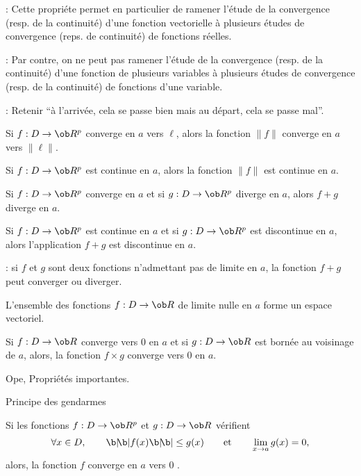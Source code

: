 \Remarque : Cette propriéte permet en particulier de ramener l'étude de la convergence (resp. de la continuité) d'une fonction vectorielle à plusieurs études de convergence (reps. de continuité) de fonctions réelles. 
\bigskip

\Remarque : Par contre, on ne peut pas ramener l'étude de la convergence (resp. de la continuité) d'une fonction de plusieurs variables à plusieurs études de convergence (resp. de la continuité) de fonctions d'une variable. 
\bigskip

\Remarque : Retenir ``à l'arrivée, cela se passe bien mais au départ, cela se passe mal''. 


Si $f:D\to\ob R^p$ converge en $a$ vers $\ell$, alors la fonction $\|f\|$ converge en $a$ vers $\|\ell\|$. 

\Invertedtrue
{} 
Si $f:D\to\ob R^p$ est continue en $a$, alors la fonction $\|f\|$ est continue en $a$. \pn


\Propriete [$D\subset\ob R^n$, $a\in\ob R^n$]
Si $f:D\to\ob R^p$ converge en $a$ et si $g:D\to\ob R^p$ diverge en $a$, alors $f+g$ diverge en $a$. 

\Invertedtrue
\Propriete [$D\subset\ob R^n$]
Si $f:D\to\ob R^p$ est continue en $a$ et si $g:D\to\ob R^p$ est discontinue en $a$, alors l'application $f+g$ est discontinue en $a$. \pn

\Remarque : si $f$ et $g$ sont deux fonctions n'admettant pas de limite en $a$, la fonction $f+g$ peut converger ou diverger. 
\bigskip


\Propriete [$D$ voisinage de $a\in\ob R^n$] 
L'ensemble des fonctions $f:D\to\ob R$ de limite nulle en $a$ forme un espace vectoriel. 

\Propriete [$D\subset\ob R^n$] 
Si $f:D\to\ob R$ converge vers $0$ en $a$ et si $g:D\to\ob R$ est bornée au voisinage de $a$, alors, la fonction $f\times g$ converge vers $0$ en $a$.

\Subsection Ope, Propriétés importantes. 

\Concept [Index=Fonctions!Principe des gendarmes] Principe des gendarmes

Si les fonctions $f:D\to\ob R^p$ et $g:D\to\ob R$ vérifient 
$$
\forall x\in D, \qquad \b|\!\b|f(x)\b|\!\b|\le g(x)\qquad \mbox{et}\qquad \lim_{x\to a}g(x)=0,
$$
alors, la fonction $f$ converge en $a$ vers $0$ . 

